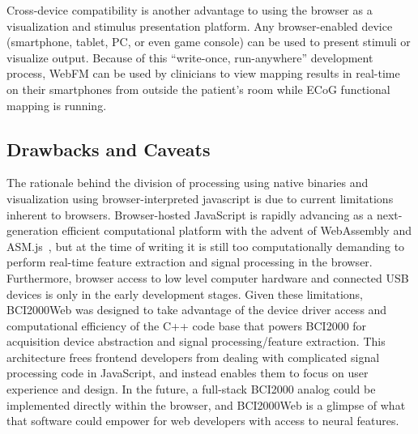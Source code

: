 \documentclass[utf8]{frontiersSCNS}
\begin{document}
Cross-device compatibility is another advantage to using the browser as a visualization and stimulus presentation platform.
Any browser-enabled device (smartphone, tablet, PC, or even game console) can be used to present stimuli or visualize output.
Because of this ``write-once, run-anywhere'' development process, WebFM can be used by clinicians to view mapping results in real-time on their smartphones from outside the patient's room while ECoG functional mapping is running.


\subsection{Drawbacks and Caveats}

The rationale behind the division of processing using native binaries and visualization using browser-interpreted javascript is due to current limitations inherent to browsers. Browser-hosted JavaScript is rapidly advancing as a next-generation efficient computational platform with the advent of WebAssembly and ASM.js~\citep{herman_asm._2014}, but at the time of writing it is still too computationally demanding to perform real-time feature extraction and signal processing in the browser.  Furthermore, browser access to low level computer hardware and connected USB devices is only in the early development stages.  Given these limitations, BCI2000Web was designed to take advantage of the device driver access and computational efficiency of the C++ code base that powers BCI2000 for acquisition device abstraction and signal processing/feature extraction.  This architecture frees frontend developers from dealing with complicated signal processing code in JavaScript, and instead enables them to focus on user experience and design.  In the future, a full-stack BCI2000 analog could be implemented directly within the browser, and BCI2000Web is a glimpse of what that software could empower for web developers with access to neural features.
\end{document}
